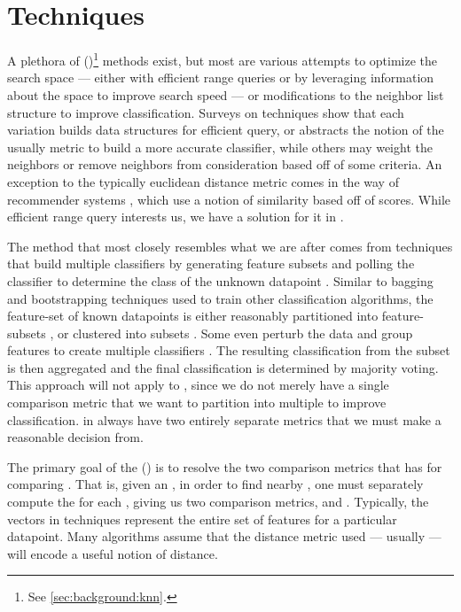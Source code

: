 \section{\kNN{} Techniques}
A plethora of \kNNlong{} (\kNN{})\footnote{See \autoref{sec:background:knn}.} methods exist, but most are various attempts to optimize the search space --- either with efficient range queries or by leveraging information about the space to improve search speed --- or modifications to the neighbor list structure to improve classification.
Surveys on \kNN{} techniques \cite{DBLP:journals/corr/abs-1007-0085, DBLP:conf/fskd/JiangCWJ07} show that each variation builds data structures for efficient query, or abstracts the notion of the usually \euclid{} metric to build a more accurate classifier, while others may weight the neighbors or remove neighbors from consideration based off of some criteria.
An exception to the typically euclidean distance metric comes in the way of recommender systems \cite{DBLP:reference/rsh/DesrosiersK11, DBLP:reference/sp/NingDK15}, which use a notion of similarity based off of scores.
While efficient range query interests us, we have a solution for it in \cite{johnson2015density}.

The method that most closely resembles what we are after comes from techniques that build multiple \kNN{} classifiers by generating feature subsets and polling the classifier to determine the class of the unknown datapoint \cite{DBLP:conf/icml/Bay98, DBLP:journals/ida/Bay99, DBLP:conf/icmlc/WangHWC05}.
Similar to bagging and bootstrapping techniques used to train other classification algorithms, the feature-set of known datapoints is either reasonably partitioned into feature-subsets \cite{DBLP:conf/icml/Bay98, DBLP:journals/ida/Bay99}, or clustered into subsets \cite{DBLP:conf/icmlc/WangHWC05}.
Some even perturb the data and group features to create multiple \kNN{} classifiers \cite{DBLP:conf/icmlc/Juan10}.
The resulting classification from the \kNN{} subset is then aggregated and the final classification is determined by majority voting.
This approach will not apply to \cplop{}, since we do not merely have a single comparison metric that we want to partition into multiple to improve classification.
\Isols{} in \cplop{} always have two entirely separate metrics that we must make a reasonable decision from.

The primary goal of the \krapmed{} (\krap{}) is to resolve the two comparison metrics that \cplop{} has for comparing \isols{}.
That is, given an \isol{}, in order to find nearby \isols{}, one must separately compute the \pearson{} \pcfunclabel{} for each \itsshort{}, giving us two comparison metrics, \pcsixt{} and \pcfive{}.
Typically, the vectors in \kNN{} techniques represent the entire set of features for a particular datapoint.
Many \kNN{} algorithms assume that the distance metric used --- usually \euclid{} --- will encode a useful notion of distance.

